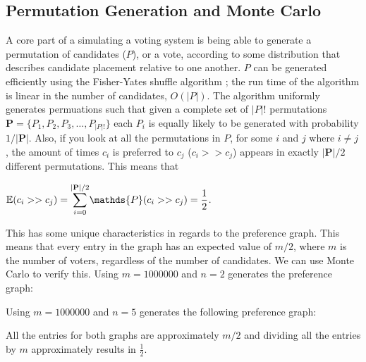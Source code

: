 \documentclass[final,5p,times,twocolumn,authoryear, 10pt]{elsarticle}
\newcommand{\dsum}[2]{\mathlarger{\sum}_{#1}^{#2}}
\begin{document}
\subsection{Permutation Generation and Monte Carlo}
\label{Permutation Generation and Monte Carlo}
A core part of a simulating a voting system is being able to generate a
permutation of candidates ($P$), or a vote, according to some distribution that
describes candidate placement relative to one another.  $P$ can be generated
efficiently using the Fisher-Yates shuffle algorithm \cite{hazra}; the run time
of the algorithm is linear in the number of candidates, $O(|P|)$. The algorithm
uniformly generates permuations such that given a complete set of $|P|!$
permutations $\mathbf{P} = \{P_1, P_2, P_3, \ldots, P_{|P|!}\}$ each $P_i$ is
equally likely to be generated with probability ${1}/{|\mathbf{P}|}$. Also, if
you look at all the permutations in $P$, for some $i$ and $j$ where $i\neq j$,
the amount of times $c_i$ is preferred to $c_j$ ($c_i >> c_j$) appears in
exactly $|\mathbf{P}|/2$ different permutations. This means that 
\begin{center}
    $\mathbb{E}(c_i >> c_j) = \dsum{i=0}{|\mathbf{P}|/2} \mathds{P}(c_i >> c_j) = \dfrac{1}{2}$.
\end{center}
This has some unique characteristics in regards to the preference graph. This
means that every entry in the graph has an expected value of $m/2$, where $m$
is the number of voters, regardless of the number of candidates. We can use
Monte Carlo to verify this. Using $m=1000000$ and $n=2$ generates the
preference graph: 
\begin{center}
\end{center}
Using $m=1000000$ and $n=5$ generates the
following preference graph:
\begin{center}
\end{center}
All the entries for both graphs are approximately $m/2$ and dividing all the
entries by $m$ approximately results in $\frac{1}{2}$.
\end{document}
